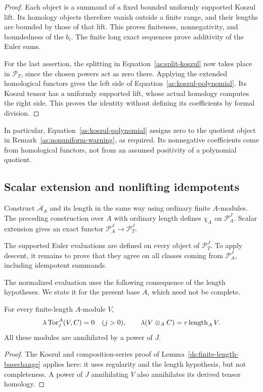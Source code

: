 \begin{proof}
Each object is a summand of a fixed bounded uniformly supported
Koszul lift. Its homology objects therefore vanish outside a finite
range, and their lengths are bounded by those of that lift. This
proves finiteness, nonnegativity, and boundedness of the $b_i$.
The finite long exact sequences prove additivity of the Euler sums.

For the last assertion, the splitting in
Equation~\eqref{as:split-koszul} now takes place in $\mathcal P_T$,
since the chosen powers act as zero there. Applying the extended
homological functors gives the left side of
Equation~\eqref{as:koszul-polynomial}. Its Koszul tensor has a
uniformly supported lift, whose actual homology computes the right
side. This proves the identity without defining its coefficients
by formal division.
\end{proof}

In particular, Equation~\eqref{as:koszul-polynomial} assigns zero
to the quotient object in Remark~\ref{as:nonuniform-warning}, as
required. Its nonnegative coefficients come from homological
functors, not from an assumed positivity of a polynomial quotient.

\subsection{Scalar extension and nonlifting idempotents}

Construct $\overline{\mathcal A}_A$ and its length in the same way
using ordinary finite $A$-modules. The preceding construction over
$A$ with ordinary length defines $\chi_A$ on $\mathcal P_A^J$.
Scalar extension gives an exact functor
$\mathcal P_A^J\to\mathcal P_T^J$.

The supported Euler evaluations are defined on every object of
$\mathcal P_T^J$. To apply descent, it remains to prove that they agree
on all classes coming from $\mathcal P_A^J$, including idempotent
summands.

The normalized evaluation uses the following consequence of the
length hypotheses. We state it for the present base $A$, which need
not be complete.

\begin{lemma}
\label{as:finite-tor}
For every finite-length $A$-module $V$,
\[
 \lambda\operatorname{Tor}_j^A(V,C)=0\quad(j>0),
 \qquad
 \lambda(V\otimes_A C)=r\operatorname{length}_A V.
\]
All these modules are annihilated by a power of $J$.
\end{lemma}

\begin{proof}
The Koszul and composition-series proof of
Lemma~\ref{ds:finite-length-basechange} applies here: it uses regularity
and the length hypothesis, but not completeness. A power of $J$
annihilating $V$ also annihilates its derived tensor homology.
\end{proof}

